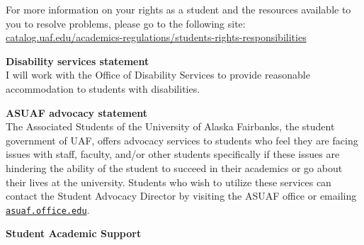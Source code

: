 \documentclass[12pt]{article}
\renewcommand{\emph}[1]{\textsf{\textbf{#1}}}
\newcommand{\localhead}[1]{\par\smallskip\textbf{#1} \smallskip\nobreak\\}%
\def\subheading#1{\localhead{\emph{#1}}}
\begin{document}
For more information on your rights as a student and the resources available to you to resolve problems, please go to the following site: \href{https://catalog.uaf.edu/academics-regulations/students-rights-responsibilities/}{catalog.uaf.edu/academics-regulations/students-rights-responsibilities}

\subheading{Disability services statement} I will work with the Office of Disability Services to provide reasonable accommodation to students with disabilities.

\subheading{ASUAF advocacy statement} The Associated Students of the University of Alaska Fairbanks, the student government of UAF, offers advocacy services to students who feel they are facing issues with staff, faculty, and/or other students specifically if these issues are hindering the ability of the student to succeed in their academics or go about their lives at the university. Students who wish to utilize these services can contact the Student Advocacy Director by visiting the ASUAF office or emailing \href{mailto:asuaf.office@alaska.edu}{\texttt{asuaf.office\@@alaska.edu}}. 


\subheading{Student Academic Support}
\end{document}
